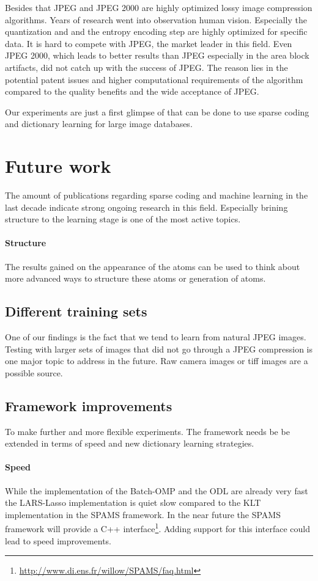 Besides that JPEG and JPEG 2000 are highly optimized lossy image compression
algorithms. Years of research went into observation human vision. Especially the
quantization and and the entropy encoding step are highly optimized for specific
data. It is hard to compete with JPEG, the market leader in this field.  Even
JPEG 2000, which leads to better results than JPEG especially in the area block
artifacts, did not catch up with the success of JPEG. The reason lies in the
potential patent issues and higher computational requirements of the algorithm
compared to the quality benefits and the wide acceptance of JPEG.

Our experiments are just a first glimpse of that can be done to use sparse
coding and dictionary learning for large image databases.


\section{Future work}
The amount of publications regarding sparse coding and machine learning in the
last decade indicate strong ongoing research in this field. Especially
brining structure to the learning stage is one of the most active topics.

\paragraph{Structure}
The results gained on the appearance of the atoms can be used to think
about more advanced ways to structure these atoms or generation of atoms.

\subsection{Different training sets}
One of our findings is the fact that we tend to learn from natural JPEG images.
Testing with larger sets of images that did not go through a JPEG compression
is one major topic to address in the future. Raw camera images or tiff images
are a possible source. 

\subsection{Framework improvements}
To make further and more flexible experiments. The framework needs be be
extended in terms of speed and new dictionary learning strategies.

\paragraph{Speed}
While the implementation of the Batch-OMP and the ODL are already very fast
the LARS-Lasso implementation is quiet slow compared to the KLT implementation
in
the SPAMS framework. In the near future the SPAMS framework will provide a C++
interface\footnote{\url{http://www.di.ens.fr/willow/SPAMS/faq.html}}. Adding
support for this interface could lead to speed improvements.

